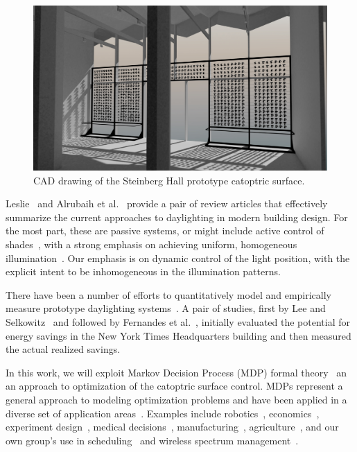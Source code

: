\begin{figure}[ht]
\centering
\includegraphics[width=0.8\linewidth]{figures/steinberg2}
\caption{CAD drawing of the Steinberg Hall prototype catoptric surface.}
\label{fig:steinberg2}
\end{figure}

Leslie~\cite{Leslie03} and Alrubaih et al.~\cite{azaise13} provide
a pair of review articles that effectively summarize the current
approaches to daylighting in modern building design.
For the most part, these are passive systems, or might include
active control of shades~\cite{kt16}, with a strong emphasis on
achieving uniform, homogeneous illumination~\cite{bwkk15,gb16}.
Our emphasis is on dynamic control of the light position, with the explicit
intent to be inhomogeneous in the illumination patterns.

There have been a number of efforts to quantitatively model and
empirically measure prototype daylighting
systems~\cite{bwkk15,fsdm14,ls06,vm16,vgf+13}. A pair of studies, first by
Lee and Selkowitz~\cite{ls06} and followed by Fernandes et al.~\cite{fsdm14},
initially evaluated the potential for energy savings in the New York Times
Headquarters building and then measured the actual realized savings.

In this work, we will exploit Markov Decision Process (MDP)
formal theory~\cite{puterman} an an approach to optimization of the
catoptric surface control. MDPs represent a general approach
to modeling optimization problems and have been applied in a diverse set of
application areas~\cite{White93}. Examples include robotics~\cite{ab10}, 
economics~\cite{bs98}, experiment design~\cite{kb85},
medical decisions~\cite{ahsr10}, manufacturing~\cite{yyl04},
agriculture~\cite{Kristensen03},
and our own group's use in scheduling~\cite{gtsg08,tggs10}
and wireless spectrum management~\cite{mgc16}.

